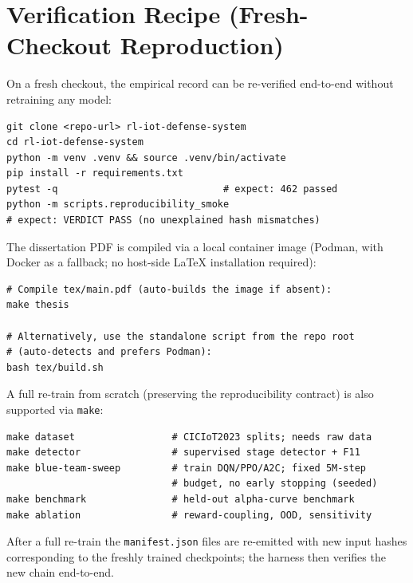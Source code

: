 \section{Verification Recipe (Fresh-Checkout Reproduction)}\label{app:recipe}
On a fresh checkout, the empirical record can be re-verified end-to-end without retraining any model:

\begin{verbatim}
git clone <repo-url> rl-iot-defense-system
cd rl-iot-defense-system
python -m venv .venv && source .venv/bin/activate
pip install -r requirements.txt
pytest -q                             # expect: 462 passed
python -m scripts.reproducibility_smoke
# expect: VERDICT PASS (no unexplained hash mismatches)
\end{verbatim}

The dissertation PDF is compiled via a local container image (Podman, with Docker as a fallback; no host-side \LaTeX{} installation required):

\begin{verbatim}
# Compile tex/main.pdf (auto-builds the image if absent):
make thesis

# Alternatively, use the standalone script from the repo root
# (auto-detects and prefers Podman):
bash tex/build.sh
\end{verbatim}

A full re-train from scratch (preserving the reproducibility contract) is also supported via \texttt{make}:

\begin{verbatim}
make dataset                 # CICIoT2023 splits; needs raw data
make detector                # supervised stage detector + F11
make blue-team-sweep         # train DQN/PPO/A2C; fixed 5M-step
                             # budget, no early stopping (seeded)
make benchmark               # held-out alpha-curve benchmark
make ablation                # reward-coupling, OOD, sensitivity
\end{verbatim}

After a full re-train the \texttt{manifest.json} files are re-emitted with new input hashes corresponding to the freshly trained checkpoints; the harness then verifies the new chain end-to-end.

